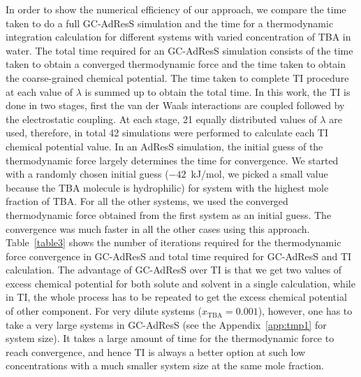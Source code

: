 \documentclass[a4paper,preprint,unsortedaddress]{revtex4-1}
\newcommand{\recheck}[1]{{\color{red} #1}}
\newcommand{\concenttba}{x_{\textrm{TBA}}}
\begin{document}
\recheck{In order to show the numerical efficiency of our approach, we compare the time taken to do a full GC-AdResS simulation and the time for a thermodynamic integration calculation for
different systems with varied concentration of TBA in water. The total time required for an GC-AdResS simulation consists of 
the time taken to obtain a converged thermodynamic force and the time taken to obtain the coarse-grained chemical potential. 
The time taken to complete TI procedure at each value of $\lambda$ is summed up to obtain the total time. In this work, the TI 
is done in two stages, first the van der Waals  interactions are coupled followed by the electrostatic coupling. At each stage, 21 
equally distributed values of $\lambda$ are used,
therefore, in total 42 simulations were performed to calculate each TI chemical potential value.
In an AdResS simulation, the initial guess of the thermodynamic force largely determines the time for convergence. 
We started with a randomly chosen initial guess
($-42$~kJ/mol, we picked a small value because the TBA molecule is hydrophilic)
for system with the highest mole fraction of TBA. For all the other systems, 
we used the converged thermodynamic force obtained from the first system as an initial guess. The convergence was much 
faster in all the other cases using this approach. Table~\ref{table3} shows the number of iterations required for 
the thermodynamic force convergence in GC-AdResS and total time required for GC-AdResS and TI calculation.
The advantage of GC-AdResS over TI
is that we get two values of excess chemical potential for both solute and solvent in a single calculation, while 
in TI, the whole process has to be repeated to get the excess chemical potential of other component. For very dilute systems ($\concenttba=0.001$), 
however, one has to take a very large systems in GC-AdResS (see the Appendix~\ref{app:tmp1} for system size). It takes a large amount of time for the thermodynamic force to reach convergence, and hence TI is always a better option at such low concentrations with a much 
smaller system size at the same mole fraction. 

}
\end{document}
